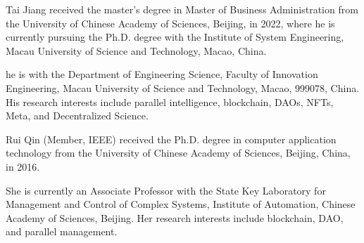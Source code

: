 \documentclass[lettersize,journal]{IEEEtran}
\begin{document}
 

\begin{IEEEbiography}{Tai Jiang}
  received the master’s degree in Master of Business Administration from the University of Chinese Academy of Sciences, Beijing, in 2022, where he is currently pursuing the Ph.D. degree with the Institute of System Engineering, Macau University of Science and Technology, Macao, China.
  
  he is with the Department of Engineering Science, Faculty of Innovation Engineering, Macau University of Science and Technology, Macao, 999078, China. His research interests include parallel intelligence, blockchain, DAOs, NFTs, Meta, and Decentralized Science.
\end{IEEEbiography}

\vspace{-33pt}

\begin{IEEEbiography}{Rui Qin}
  (Member, IEEE) received the Ph.D. degree in computer application technology from the University of Chinese Academy of Sciences, Beijing, China, in 2016.

  She is currently an Associate Professor with the State Key Laboratory for Management and Control of Complex Systems, Institute of Automation, Chinese Academy of Sciences, Beijing. Her research interests include blockchain, DAO, and parallel management.
\end{IEEEbiography}

\vspace{-33pt}
\end{document}
